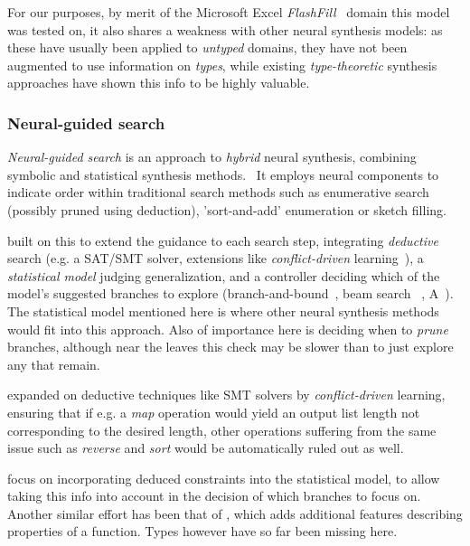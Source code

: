 \documentclass{article}
\begin{document}
For our purposes, by merit of the Microsoft Excel \emph{FlashFill}~\citep{prose} domain this model was tested on,
it also shares a weakness with other neural synthesis models:
as these have usually been applied to \emph{untyped} domains,
they have not been augmented to use information on \emph{types},
while existing \emph{type-theoretic} synthesis approaches have shown this info to be highly valuable.

\subsubsection{Neural-guided search} \label{sec:ngs}

\emph{Neural-guided search} is an approach to \emph{hybrid} neural synthesis,
combining symbolic and statistical synthesis methods.~\citep{nps}
It employs neural components to indicate order within traditional search methods
such as enumerative search (possibly pruned using deduction),
'sort-and-add' enumeration or sketch filling.~\citep{deepcoder}

\citet{kalyan2018neural} built on this to extend the guidance to each search step,
integrating \emph{deductive} search (e.g. a SAT/SMT solver, extensions
like \emph{conflict-driven} learning~\citep{feng2018program}),
a \emph{statistical model} judging generalization,
and a controller deciding which of the model's suggested branches
to explore (branch-and-bound~\citep{kalyan2018neural}, beam search%
~\citep{polosukhin2018neural}, A\*~\citep{lee2018accelerating}).
The statistical model mentioned here is where other
neural synthesis methods would fit into this approach.
Also of importance here is deciding when to \emph{prune} branches,
although near the leaves this check may be slower
than to just explore any that remain.~\citep{polozov}

\citet{feng2018program} expanded on deductive techniques
like SMT solvers by \emph{conflict-driven} learning,
ensuring that if e.g. a \emph{map} operation would yield an
output list length not corresponding to the desired length,
other operations suffering from the same issue such as
\emph{reverse} and \emph{sort} would be automatically ruled out as well.

\citet{zhang2018leveraging} focus on incorporating deduced constraints
into the statistical model, to allow taking this info into account
in the decision of which branches to focus on.
Another similar effort has been that of \citet{odena2020learning},
which adds additional features describing properties of a function.
Types however have so far been missing here.
\end{document}
